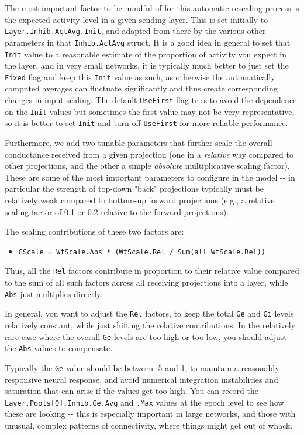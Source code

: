 \documentclass[11pt,twoside]{article}
\newif\myifpdf
\begin{document}
The most important factor to be mindful of for this automatic rescaling
process is the expected activity level in a given sending layer. This is
set initially to \texttt{Layer.Inhib.ActAvg.Init}, and adapted from
there by the various other parameters in that \texttt{Inhib.ActAvg}
struct. It is a good idea in general to set that \texttt{Init} value to
a reasonable estimate of the proportion of activity you expect in the
layer, and in very small networks, it is typically much better to just
set the \texttt{Fixed} flag and keep this \texttt{Init} value as such,
as otherwise the automatically computed averages can fluctuate
significantly and thus create corresponding changes in input scaling.
The default \texttt{UseFirst} flag tries to avoid the dependence on the
\texttt{Init} values but sometimes the first value may not be very
representative, so it is better to set \texttt{Init} and turn off
\texttt{UseFirst} for more reliable performance.

Furthermore, we add two tunable parameters that further scale the
overall conductance received from a given projection (one in a
\emph{relative} way compared to other projections, and the other a
simple \emph{absolute} multiplicative scaling factor). These are some of
the most important parameters to configure in the model -\/- in
particular the strength of top-down "back" projections typically must be
relatively weak compared to bottom-up forward projections (e.g., a
relative scaling factor of 0.1 or 0.2 relative to the forward
projections).

The scaling contributions of these two factors are:

\begin{itemize}
\tightlist
\item
  \texttt{GScale\ =\ WtScale.Abs\ *\ (WtScale.Rel\ /\ Sum(all\ WtScale.Rel))}
\end{itemize}

Thus, all the \texttt{Rel} factors contribute in proportion to their
relative value compared to the sum of all such factors across all
receiving projections into a layer, while \texttt{Abs} just multiplies
directly.

In general, you want to adjust the \texttt{Rel} factors, to keep the
total \texttt{Ge} and \texttt{Gi} levels relatively constant, while just
shifting the relative contributions. In the relatively rare case where
the overall \texttt{Ge} levels are too high or too low, you should
adjust the \texttt{Abs} values to compensate.

Typically the \texttt{Ge} value should be between .5 and 1, to maintain
a reasonably responsive neural response, and avoid numerical integration
instabilities and saturation that can arise if the values get too high.
You can record the \texttt{Layer.Pools{[}0{]}.Inhib.Ge.Avg} and
\texttt{.Max} values at the epoch level to see how these are looking
-\/- this is especially important in large networks, and those with
unusual, complex patterns of connectivity, where things might get out of
whack.
\end{document}
